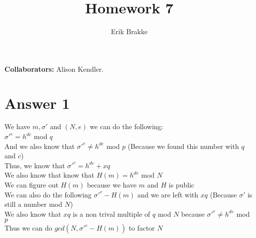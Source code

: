 \documentclass[11pt]{article}
\providecommand{\myparab}[1]{\smallskip\noindent\textbf{#1} }
\theoremstyle{definition}
\begin{document}
\title{Homework 7}
\author{Erik Brakke}
\maketitle

\thispagestyle{fancy}

\myparab{Collaborators: }  Alison Kendler.
 
 
\section*{Answer 1}
We have $m, \sigma'$ and $(N, e)$ we can do the following:\\
$\sigma'^e = h^{de}$ mod $q$\\
And we also know that $\sigma'^e \neq h^{de}$ mod $p$ (Because we found this number with $q$ and $c$)\\
Thus, we know that $\sigma'^e = h^{de} + xq$\\
We also know that know that $H(m) = h^{de}$ mod $N$\\
We can figure out $H(m)$ because we have $m$ and $H$ is public\\
We can also do the following $\sigma'^e - H(m)$ and we are left with $xq$ (Because $\sigma'$ is still a number mod $N$)\\
We also know that $xq$ is a non trival multiple of $q$ mod $N$ because $\sigma'^e \neq h^{de}$ mod $p$\\
Thus we can do $gcd(N, \sigma'^e - H(m))$ to factor $N$\\
\end{document}
